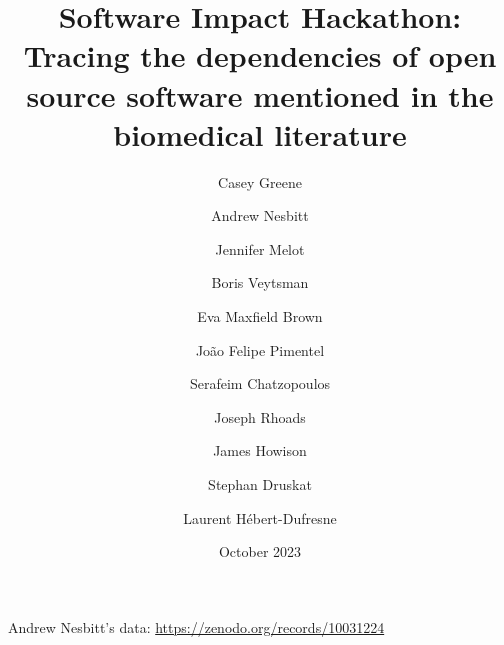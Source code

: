 \documentclass{article}
\title{Software Impact Hackathon:  Tracing the dependencies of open
  source software mentioned in the biomedical literature}
\date{October 2023}
\author{Casey Greene \and
Andrew Nesbitt \and
Jennifer Melot \and
Boris Veytsman \and
Eva Maxfield Brown \and
João Felipe Pimentel \and
Serafeim Chatzopoulos \and
Joseph Rhoads \and
James Howison \and
Stephan Druskat \and
Laurent H\'ebert-Dufresne}
\begin{document}
\maketitle

Andrew Nesbitt's data: \url{https://zenodo.org/records/10031224}
\end{document}
